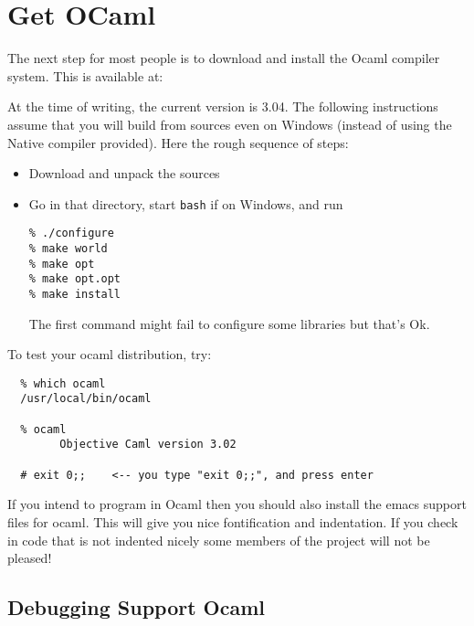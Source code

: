 \documentclass{article}
\def\t#1{{\tt #1}}
\begin{document}
\section{Get OCaml}\label{sec-ocaml}

The next step for most people is to download and install the Ocaml
compiler system.  This is available at:


At the time of writing, the current version is 3.04. The following
instructions assume that you will build from sources even on Windows (instead
of using the Native compiler provided). Here the rough sequence of steps:
\begin{itemize}
\item Download and unpack the sources
\item Go in that directory, start \t{bash} if on Windows, and run
\begin{verbatim}
% ./configure
% make world
% make opt
% make opt.opt
% make install
\end{verbatim}

 The first command might fail to configure some libraries but that's Ok. 
\end{itemize}

To test your ocaml distribution, try:

\begin{verbatim}
  % which ocaml
  /usr/local/bin/ocaml

  % ocaml
        Objective Caml version 3.02

  # exit 0;;    <-- you type "exit 0;;", and press enter
\end{verbatim}

 If you intend to program in Ocaml then you should also install the emacs
support files for ocaml. This will give you nice fontification and
indentation. If you check in code that is not indented nicely some members of
the project will not be pleased!

 \subsection{Debugging Support Ocaml}
\end{document}
